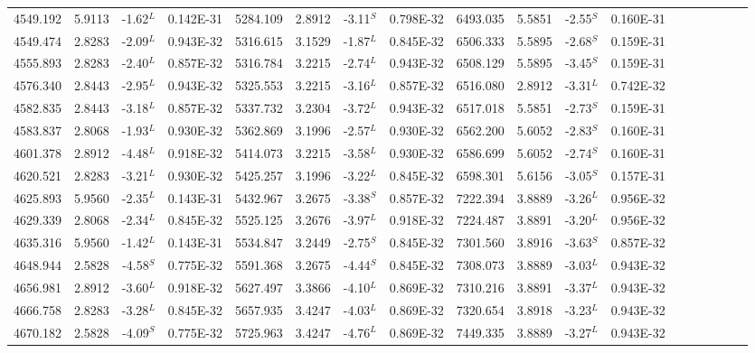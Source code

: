 \documentclass[traditabstract]{aa} %
\begin{document}
\begin{table}
\begin{minipage}[t]{\textwidth}
\begin{tabular}{cccccccccccccccccc}
 4549.192 & 5.9113 &-1.62$^L$ & 0.142E-31  & 5284.109 & 2.8912 &-3.11$^S$ & 0.798E-32  & 6493.035 & 5.5851 &-2.55$^S$ & 0.160E-31  \\   
 4549.474 & 2.8283 &-2.09$^L$ & 0.943E-32  & 5316.615 & 3.1529 &-1.87$^L$ & 0.845E-32  & 6506.333 & 5.5895 &-2.68$^S$ & 0.159E-31  \\   
 4555.893 & 2.8283 &-2.40$^L$ & 0.857E-32  & 5316.784 & 3.2215 &-2.74$^L$ & 0.943E-32  & 6508.129 & 5.5895 &-3.45$^S$ & 0.159E-31  \\   
 4576.340 & 2.8443 &-2.95$^L$ & 0.943E-32  & 5325.553 & 3.2215 &-3.16$^L$ & 0.857E-32  & 6516.080 & 2.8912 &-3.31$^L$ & 0.742E-32  \\   
 4582.835 & 2.8443 &-3.18$^L$ & 0.857E-32  & 5337.732 & 3.2304 &-3.72$^L$ & 0.943E-32  & 6517.018 & 5.5851 &-2.73$^S$ & 0.159E-31  \\   
 4583.837 & 2.8068 &-1.93$^L$ & 0.930E-32  & 5362.869 & 3.1996 &-2.57$^L$ & 0.930E-32  & 6562.200 & 5.6052 &-2.83$^S$ & 0.160E-31  \\   
 4601.378 & 2.8912 &-4.48$^L$ & 0.918E-32  & 5414.073 & 3.2215 &-3.58$^L$ & 0.930E-32  & 6586.699 & 5.6052 &-2.74$^S$ & 0.160E-31  \\   
 4620.521 & 2.8283 &-3.21$^L$ & 0.930E-32  & 5425.257 & 3.1996 &-3.22$^L$ & 0.845E-32  & 6598.301 & 5.6156 &-3.05$^S$ & 0.157E-31  \\   
 4625.893 & 5.9560 &-2.35$^L$ & 0.143E-31  & 5432.967 & 3.2675 &-3.38$^S$ & 0.857E-32  & 7222.394 & 3.8889 &-3.26$^L$ & 0.956E-32  \\   
 4629.339 & 2.8068 &-2.34$^L$ & 0.845E-32  & 5525.125 & 3.2676 &-3.97$^L$ & 0.918E-32  & 7224.487 & 3.8891 &-3.20$^L$ & 0.956E-32  \\   
 4635.316 & 5.9560 &-1.42$^L$ & 0.143E-31  & 5534.847 & 3.2449 &-2.75$^S$ & 0.845E-32  & 7301.560 & 3.8916 &-3.63$^S$ & 0.857E-32  \\   
 4648.944 & 2.5828 &-4.58$^S$ & 0.775E-32  & 5591.368 & 3.2675 &-4.44$^S$ & 0.845E-32  & 7308.073 & 3.8889 &-3.03$^L$ & 0.943E-32  \\   
 4656.981 & 2.8912 &-3.60$^L$ & 0.918E-32  & 5627.497 & 3.3866 &-4.10$^L$ & 0.869E-32  & 7310.216 & 3.8891 &-3.37$^L$ & 0.943E-32  \\   
 4666.758 & 2.8283 &-3.28$^L$ & 0.845E-32  & 5657.935 & 3.4247 &-4.03$^L$ & 0.869E-32  & 7320.654 & 3.8918 &-3.23$^L$ & 0.943E-32  \\   
 4670.182 & 2.5828 &-4.09$^S$ & 0.775E-32  & 5725.963 & 3.4247 &-4.76$^L$ & 0.869E-32  & 7449.335 & 3.8889 &-3.27$^L$ & 0.943E-32  \\   

\end{tabular}
\end{minipage}
\end{table}
\end{document}
